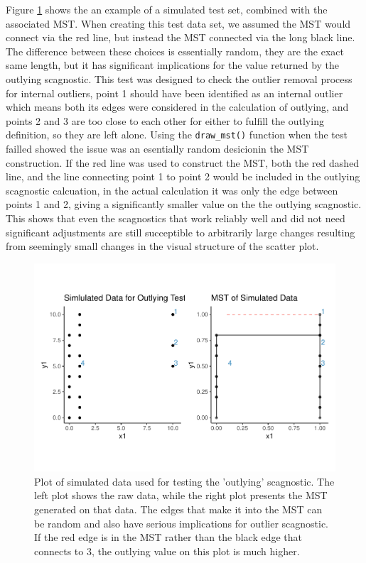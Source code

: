 Figure \ref{fig:outlying-test-plot} shows the an example of a simulated
test set, combined with the associated MST. When creating this test data
set, we assumed the MST would connect via the red line, but instead the
MST connected via the long black line. The difference between these
choices is essentially random, they are the exact same length, but it
has significant implications for the value returned by the outlying
scagnostic. This test was designed to check the outlier removal process
for internal outliers, point 1 should have been identified as an
internal outlier which means both its edges were considered in the
calculation of outlying, and points 2 and 3 are too close to each other
for either to fulfill the outlying definition, so they are left alone.
Using the \texttt{draw\_mst()} function when the test failled showed the
issue was an esentially random desicionin the MST construction. If the
red line was used to construct the MST, both the red dashed line, and
the line connecting point 1 to point 2 would be included in the outlying
scagnostic calcuation, in the actual calculation it was only the edge
between points 1 and 2, giving a significantly smaller value on the the
outlying scagnostic. This shows that even the scagnostics that work
reliably well and did not need significant adjustments are still
succeptible to arbitrarily large changes resulting from seemingly small
changes in the visual structure of the scatter plot.

\begin{Schunk}
\begin{figure}
\includegraphics[width=0.8\linewidth]{mason-lee-laa-cook_files/figure-latex/outlying-test-plot-1} \caption[Plot of simulated data used for testing the 'outlying' scagnostic]{Plot of simulated data used for testing the 'outlying' scagnostic. The left plot shows the raw data, while the right plot presents the MST generated on that data. The edges that make it into the MST can be random and also have serious implications for outlier scagnostic. If the red edge is in the MST rather than the black edge that connects to 3, the outlying value on this plot is much higher.}\label{fig:outlying-test-plot}
\end{figure}
\end{Schunk}

